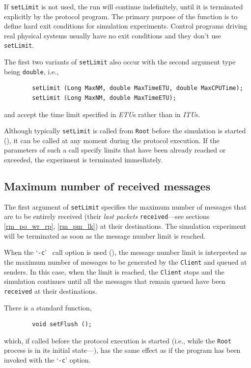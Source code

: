 If {\tt setLimit} is not used, the run will continue
indefinitely, until it is terminated explicitly by the protocol
program.
The primary purpose of the function is to define hard exit conditions for
simulation experiments.
Control programs driving real physical systems usually have no exit conditions
and they don't use {\tt setLimit}.

The first two variants of {\tt setLimit} also occur with the second argument type being {\tt double}, i.e.,
\begin{verbatim}
        setLimit (Long MaxNM, double MaxTimeETU, double MaxCPUTime);
        setLimit (Long MaxNM, double MaxTimeETU);
\end{verbatim}
\noindent
and accept the time limit specified in {\em ETU\/}s rather than in {\em ITU\/}s.

Although typically {\tt setLimit} is called from {\tt Root} before the
simulation is started (),
it can be called at any moment during the protocol execution.
If the parameters of such a call specify limits that have been already
reached or exceeded, the experiment is terminated immediately.

\subsection{Maximum number of received messages}
\label{rm_ts_mm}

The first argument of {\tt setLimit} specifies the maximum number of
messages that are to be entirely received (their {\em last packets\/}
{\tt received}---see sections \ref{rm_po_wr_rp}, \ref{rm_pm_lk}) at their
destinations.
The simulation experiment will be terminated as soon as the message number
limit is reached.

When the `{\tt -c}' \smurph\ call option is used (),
the message number limit is interpreted as the maximum number of messages
to be generated by the {\tt Client} and queued at senders.
In this case, when the limit is reached, the {\tt Client} stops and the
simulation continues until all the messages that remain queued have been
{\tt received} at their destinations.

There is a standard function,
\begin{verbatim}
        void setFlush ();
\end{verbatim}
which, if called before the protocol
execution is started (i.e., while the {\tt Root} process is in its initial
state---), has the same effect as
if the program has been invoked with the `{\tt -c}' option.

